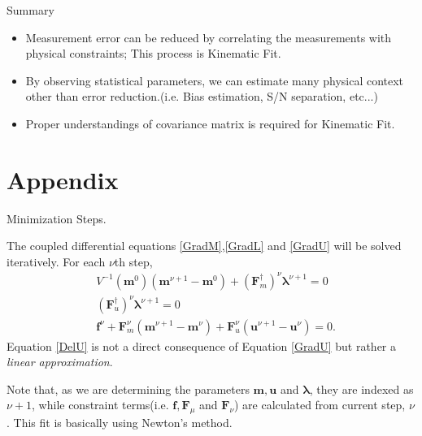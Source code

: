 \documentclass[
	xcolor=dvipsnames,
	aspectratio=169,	
	10pt, 
	]{beamer}
\begin{document}
\begin{frame}{Summary}
	\Large
	\begin{block}{}
		\begin{itemize}
			\item Measurement error can be reduced by correlating the measurements with physical constraints; This process is Kinematic Fit.
			\item By observing statistical parameters, we can estimate many physical context other than error reduction.(i.e. Bias estimation, S/N separation, etc...)
			\item Proper understandings of covariance matrix is required for Kinematic Fit.
		\end{itemize}
	\end{block}
	
\end{frame}
\section{Appendix}
\begin{frame}{Minimization Steps.}
	\large
	\begin{block}{}
		The coupled differential equations \eqref{GradM},\eqref{GradL} and \eqref{GradU} will be solved iteratively. For each $\nu$th step,
		\begin{align}
			&V^{-1}(\mathbf m^0)(\mathbf{m}^{\nu+1}-\mathbf{m}^0)+(\mathbf{F}_m^\dagger)^\nu\mathbf\lambda^{\nu+1}=0\label{DelM}\\
			&(\mathbf{F}_u^\dagger)^\nu\mathbf\lambda^{\nu+1}=0\label{DelL}\\
			&\mathbf f^\nu + \mathbf F^\nu_m (\mathbf m^{\nu+1}-\mathbf m^\nu) + \mathbf F^\nu_u(\mathbf u^{\nu+1}-\mathbf u^\nu)=0\label{DelU}.
		\end{align}
		Equation \eqref{DelU} is not a direct consequence of Equation \eqref{GradU} but rather a \textit{linear approximation}.  
		
		Note that, as we are determining the parameters $\mathbf m, \mathbf u$ and $\mathbf \lambda$, they are indexed as $\nu+1$, while constraint terms(i.e. $\mathbf f,\mathbf F_\mu$ and $\mathbf F_\nu$) are calculated from current step, $\nu$. This fit is basically using Newton's method.
	\end{block}
\end{frame}
\end{document}
